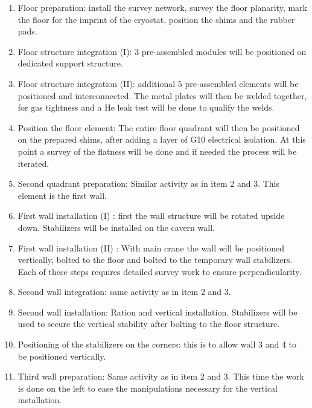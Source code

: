 \begin{enumerate}

\item Floor preparation: install the survey network, survey the floor planarity, mark
the floor for the imprint of the cryostat, position the shims and the rubber pads.

\item Floor structure integration (I): 3 pre-assembled modules will be positioned
on dedicated support structure.

\item Floor structure integration (II): additional 5 pre-assembled elements will be positioned and interconnected. The metal plates will then be welded together, for gas tightness and a He leak test will be done to qualify the welds.

\item Position the floor element: The entire floor quadrant will then be positioned on the prepared shims, after adding a layer of G10 electrical isolation. At this point a survey of the flatness will be done and if needed the process will be iterated.

\item Second quadrant preparation: Similar activity as in item  2 and 3. This element is the first wall.

\item First wall installation (I) : first the wall structure will be rotated upside down. Stabilizers will be installed on the cavern wall.
 
\item First wall installation (II) : With main crane the wall will be positioned vertically, bolted to the floor and bolted to the temporary wall stabilizers. Each of these steps requires detailed survey work to ensure perpendicularity.
 
\item Second wall integration: same activity as in item 2 and 3.
 
\item Second wall installation: Ration and vertical installation. Stabilizers will be used to secure the vertical stability after bolting to the floor structure.

\item Positioning of the stabilizers on the corners: this is to allow wall 3 and 4 to be positioned vertically.
 
\item Third wall preparation: Same activity as in item 2 and 3. This time the work is done on the left to ease the manipulations necessary for the vertical installation.


\end{enumerate}
